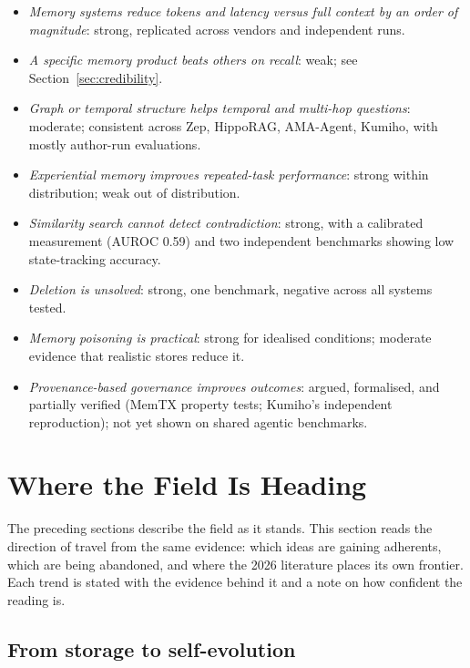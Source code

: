 \documentclass[11pt]{article}
\begin{document}
\begin{itemize}
\item \emph{Memory systems reduce tokens and latency versus full context by an order of magnitude}: strong, replicated across vendors and independent runs.
\item \emph{A specific memory product beats others on recall}: weak; see Section~\ref{sec:credibility}.
\item \emph{Graph or temporal structure helps temporal and multi-hop questions}: moderate; consistent across Zep, HippoRAG, AMA-Agent, Kumiho, with mostly author-run evaluations.
\item \emph{Experiential memory improves repeated-task performance}: strong within distribution; weak out of distribution.
\item \emph{Similarity search cannot detect contradiction}: strong, with a calibrated measurement (AUROC 0.59) and two independent benchmarks showing low state-tracking accuracy.
\item \emph{Deletion is unsolved}: strong, one benchmark, negative across all systems tested.
\item \emph{Memory poisoning is practical}: strong for idealised conditions; moderate evidence that realistic stores reduce it.
\item \emph{Provenance-based governance improves outcomes}: argued, formalised, and partially verified (MemTX property tests; Kumiho's independent reproduction); not yet shown on shared agentic benchmarks.
\end{itemize}

\section{Where the Field Is Heading}
\label{sec:trajectory}

The preceding sections describe the field as it stands. This section reads the direction of travel from the same evidence: which ideas are gaining adherents, which are being abandoned, and where the 2026 literature places its own frontier. Each trend is stated with the evidence behind it and a note on how confident the reading is.

\subsection{From storage to self-evolution}
\end{document}
